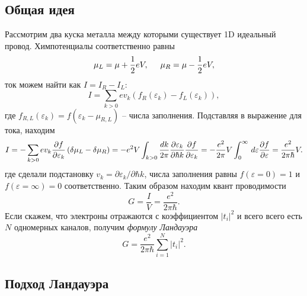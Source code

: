 \subsection{Общая идея}

Рассмотрим два куска металла между которыми существует 1D идеальный провод. Химпотенциалы соответственно равны
\begin{equation*}
	\mu_L = \mu + \frac{1}{2} eV, 
	\hspace{5 mm} 
	\mu_R = \mu - \frac{1}{2} eV,
\end{equation*}
ток можем найти как $I = I_R-I_L$:
\begin{equation*}
	I = \sum_{k > 0} e v_k \left(
		f_R(\varepsilon_k) - f_L (\varepsilon_k)
	\right),
\end{equation*}
где $f_{R, L} (\varepsilon_k) = f(\varepsilon_k - \mu_{R, L})$ -- числа заполнения. 
Подставляя в выражение для тока, находим
\begin{equation*}
	I = -\sum_{k > 0} e v_k \frac{\partial f}{\partial \varepsilon_k} \left(
		\delta \mu_L - \delta \mu_R
	\right) = - e^2 V \int_{k>0} \frac{d k}{2\pi} \frac{\partial \varepsilon_k}{\partial \hbar k}  \frac{\partial f}{\partial \varepsilon_k} = - \frac{e^2}{2\pi} V \int_{0}^{\infty} \, d \varepsilon \frac{\partial f}{\partial \varepsilon} =  \frac{e^2}{2\pi \hbar} V.
\end{equation*}
где сделали подстановку $v_k = {\partial \varepsilon_k}/{\partial \hbar k}$, числа заполнения равны $f(\varepsilon=0)=1$ и $f(\varepsilon=\infty)= 0$ соответственно. Таким образом находим квант проводимости
\begin{equation*}
	G = \frac{I}{V} = \frac{e^2}{2 \pi \hbar}.
\end{equation*}
Если скажем, что электроны отражаются с коэффициентом $|t_i|^2$ и всего всего есть $N$ одномерных каналов, получим \textit{формулу Ландауэра}
\begin{equation*}
	G = \frac{e^2}{2\pi \hbar} \sum_{i=1}^N |t_i|^2.
\end{equation*}





\subsection{Подход Ландауэра}


